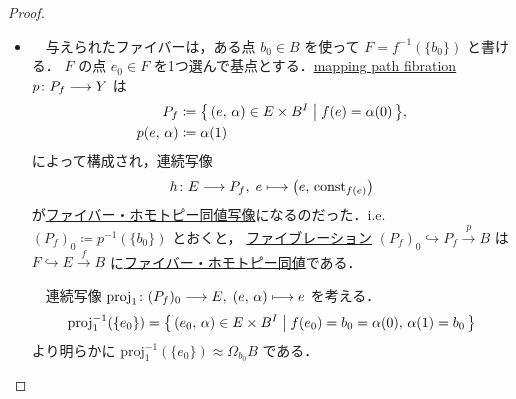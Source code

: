 \documentclass[algtopo_main]{subfiles}
\begin{document}
\begin{proof}
    \begin{itemize}
        \item 　与えられたファイバーは，ある点 $b_0 \in B$ を使って $F = f^{-1}(\{b_0\})$ と書ける．
        $F$ の点 $e_0 \in F$ を1つ選んで基点とする．\hyperref[thm:path-space-fibration]{mapping path fibration} $p \colon P_f \longrightarrow Y$ は
        \begin{align}
            P_f &\coloneqq \bigl\{\, (e,\, \alpha) \in E \times B^I \bigm| f(e) = \alpha(0) \,\bigr\}, \\
            p(e,\, \alpha) &\coloneqq \alpha(1)
        \end{align}
        によって構成され，連続写像
        \begin{align}
            h \colon E \longrightarrow P_f,\; e \longmapsto \bigl( e,\, \mathrm{const}_{f(e)} \bigr) 
        \end{align}
        が\hyperref[def:fib-homotopy]{ファイバー・ホモトピー同値写像}になるのだった．i.e.
        $(P_f)_0 \coloneqq p^{-1}(\{b_0\})$ とおくと，
        \hyperref[def:fibration]{ファイブレーション} $(P_f)_0 \hookrightarrow P_f \xrightarrow{p} B$ は $F \hookrightarrow E \xrightarrow{f} B$ に\hyperref[def:fib-homotopy]{ファイバー・ホモトピー同値}である．

        　連続写像 $\mathrm{proj}_1 \colon (P_f)_0 \longrightarrow E,\; (e,\, \alpha) \longmapsto e$ を考える．
        \begin{align}
            \mathrm{proj}_1^{-1} (\{e_0\}) = \bigl\{\, (e_0,\, \alpha) \in E \times B^I \bigm| f(e_0) = b_0 = \alpha(0),\, \alpha(1) = b_0 \,\bigr\} 
        \end{align}
        より明らかに $\mathrm{proj}_1^{-1} (\{e_0\}) \approx \Omega_{b_0} B$ である．
        

\end{itemize}
\end{proof}
\end{document}

